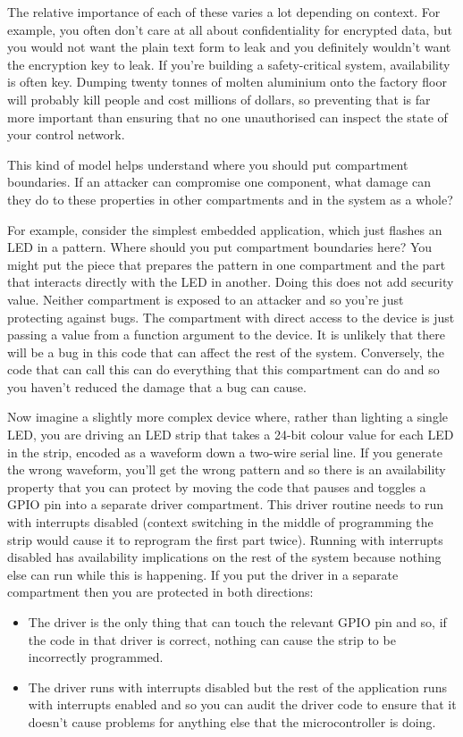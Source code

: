 The relative importance of each of these varies a lot depending on context.
For example, you often don't care at all about confidentiality for encrypted data, but you would not want the plain text form to leak and you definitely wouldn't want the encryption key to leak.
If you're building a safety-critical system, availability is often key.
Dumping twenty tonnes of molten aluminium onto the factory floor will probably kill people and cost millions of dollars, so preventing that is far more important than ensuring that no one unauthorised can inspect the state of your control network.

This kind of model helps understand where you should put compartment boundaries.
If an attacker can compromise one component, what damage can they do to these properties in other compartments and in the system as a whole?

For example, consider the simplest embedded application, which just flashes an LED in a pattern.
Where should you put compartment boundaries here?
You might put the piece that prepares the pattern in one compartment and the part that interacts directly with the LED in another.
Doing this does not add security value.
Neither compartment is exposed to an attacker and so you're just protecting against bugs.
The compartment with direct access to the device is just passing a value from a function argument to the device.
It is unlikely that there will be a bug in this code that can affect the rest of the system.
Conversely, the code that can call this can do everything that this compartment can do and so you haven't reduced the damage that a bug can cause.

Now imagine a slightly more complex device where, rather than lighting a single LED, you are driving an LED strip that takes a 24-bit colour value for each LED in the strip, encoded as a waveform down a two-wire serial line.
If you generate the wrong waveform, you'll get the wrong pattern and so there is an availability property that you can protect by moving the code that pauses and toggles a GPIO pin into a separate driver compartment.
This driver routine needs to run with interrupts disabled (context switching in the middle of programming the strip would cause it to reprogram the first part twice).
Running with interrupts disabled has availability implications on the rest of the system because nothing else can run while this is happening.
If you put the driver in a separate compartment then you are protected in both directions:

\begin{itemize}
	\item{The driver is the only thing that can touch the relevant GPIO pin and so, if the code in that driver is correct, nothing can cause the strip to be incorrectly programmed.}
	\item{The driver runs with interrupts disabled but the rest of the application runs with interrupts enabled and so you can audit the driver code to ensure that it doesn't cause problems for anything else that the microcontroller is doing.}
\end{itemize}

